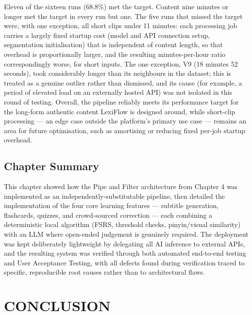 \documentclass[oneside]{utmthesis}
\begin{document}
Eleven of the sixteen runs (68.8\%) met the target. Content nine minutes or longer met the target in every run but one. The five runs that missed the target were, with one exception, all short clips under 11 minutes: each processing job carries a largely fixed startup cost (model and API connection setup, segmentation initialisation) that is independent of content length, so that overhead is proportionally larger, and the resulting minutes-per-hour ratio correspondingly worse, for short inputs. The one exception, V9 (18 minutes 52 seconds), took considerably longer than its neighbours in the dataset; this is treated as a genuine outlier rather than dismissed, and its cause (for example, a period of elevated load on an externally hosted API) was not isolated in this round of testing. Overall, the pipeline reliably meets its performance target for the long-form authentic content LexiFlow is designed around, while short-clip processing --- an edge case outside the platform's primary use case --- remains an area for future optimisation, such as amortising or reducing fixed per-job startup overhead.

\section{Chapter Summary}
This chapter showed how the Pipe and Filter architecture from Chapter 4 was implemented as an independently-substitutable pipeline, then detailed the implementation of the four core learning features --- subtitle generation, flashcards, quizzes, and crowd-sourced correction --- each combining a deterministic local algorithm (FSRS, threshold checks, pinyin/visual similarity) with an LLM where open-ended judgement is genuinely required. The deployment was kept deliberately lightweight by delegating all AI inference to external APIs, and the resulting system was verified through both automated end-to-end testing and User Acceptance Testing, with all defects found during verification traced to specific, reproducible root causes rather than to architectural flaws.

\chapter{CONCLUSION}
\end{document}
